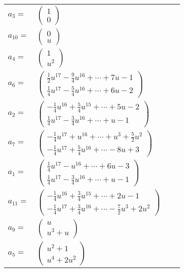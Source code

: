 \documentclass[1p]{elsarticle_modified}
\theoremstyle{definition}
\begin{document}
\begin{tabular}{m{7pt} m{180pt} m{7pt} m{180pt} }
\flushright $a_{3}=$&$\begin{pmatrix}1\\0\end{pmatrix}$ \\
\flushright $a_{10}=$&$\begin{pmatrix}0\\u\end{pmatrix}$ \\
\flushright $a_{4}=$&$\begin{pmatrix}1\\u^2\end{pmatrix}$ \\
\flushright $a_{6}=$&$\begin{pmatrix}\frac{1}{2} u^{17}-\frac{9}{4} u^{16}+\cdots+7 u-1\\\frac{1}{4} u^{17}-\frac{5}{4} u^{16}+\cdots+6 u-2\end{pmatrix}$ \\
\flushright $a_{2}=$&$\begin{pmatrix}-\frac{1}{4} u^{16}+\frac{5}{4} u^{15}+\cdots+5 u-2\\\frac{1}{4} u^{17}-\frac{3}{4} u^{16}+\cdots+u-1\end{pmatrix}$ \\
\flushright $a_{7}=$&$\begin{pmatrix}-\frac{1}{4} u^{17}+u^{16}+\cdots+u^3+\frac{5}{2} u^2\\-\frac{1}{4} u^{17}+\frac{5}{4} u^{16}+\cdots-8 u+3\end{pmatrix}$ \\
\flushright $a_{1}=$&$\begin{pmatrix}\frac{1}{4} u^{17}- u^{16}+\cdots+6 u-3\\\frac{1}{4} u^{17}-\frac{3}{4} u^{16}+\cdots+u-1\end{pmatrix}$ \\
\flushright $a_{11}=$&$\begin{pmatrix}-\frac{1}{4} u^{16}+\frac{3}{4} u^{15}+\cdots+2 u-1\\-\frac{1}{4} u^{17}+\frac{3}{4} u^{16}+\cdots-\frac{7}{2} u^3+2 u^2\end{pmatrix}$ \\
\flushright $a_{9}=$&$\begin{pmatrix}u\\u^3+u\end{pmatrix}$ \\
\flushright $a_{5}=$&$\begin{pmatrix}u^2+1\\u^4+2 u^2\end{pmatrix}$ \\

\end{tabular}
\end{document}
